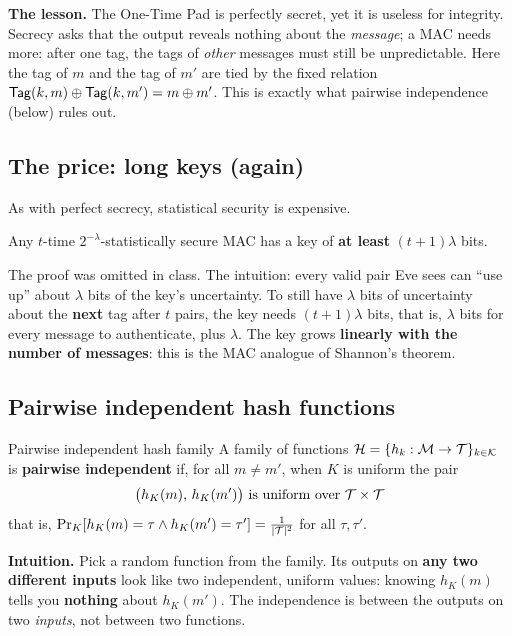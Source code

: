 \textbf{The lesson.} The One-Time Pad is perfectly secret, yet it is useless for integrity. Secrecy asks that the output reveals nothing about the \textit{message}; a MAC needs more: after one tag, the tags of \textit{other} messages must still be unpredictable. Here the tag of $m$ and the tag of $m'$ are tied by the fixed relation $\mathsf{Tag}(k, m) \oplus \mathsf{Tag}(k, m') = m \oplus m'$. This is exactly what pairwise independence (below) rules out.

\subsection{The price: long keys (again)}

As with perfect secrecy, statistical security is expensive.

\begin{framedthm}[label={thm:mac-key-size}]{}
  Any $t$-time $2^{-\lambda}$-statistically secure MAC has a key of \textbf{at least} $(t+1)\lambda$ bits.
\end{framedthm}

The proof was omitted in class. The intuition: every valid pair Eve sees can ``use up'' about $\lambda$ bits of the key's uncertainty. To still have $\lambda$ bits of uncertainty about the \textbf{next} tag after $t$ pairs, the key needs $(t+1)\lambda$ bits, that is, $\lambda$ bits for every message to authenticate, plus $\lambda$. The key grows \textbf{linearly with the number of messages}: this is the MAC analogue of Shannon's theorem.

\subsection{Pairwise independent hash functions}

\begin{frameddefn}[label={def:pairwise}]{Pairwise independent hash family}
  A family of functions $\mathcal{H} = \{h_k : \mathcal{M} \to \mathcal{T}\}_{k \in \mathcal{K}}$ is \textbf{pairwise independent} if, for all $m \neq m'$, when $K$ is uniform the pair
  \[
    \big(h_K(m),\, h_K(m')\big) \text{ is uniform over } \mathcal{T} \times \mathcal{T}
  \]
  that is, $\Pr_K[h_K(m) = \tau \wedge h_K(m') = \tau'] = \frac{1}{|\mathcal{T}|^2}$ for all $\tau, \tau'$.
\end{frameddefn}

\textbf{Intuition.} Pick a random function from the family. Its outputs on \textbf{any two different inputs} look like two independent, uniform values: knowing $h_K(m)$ tells you \textbf{nothing} about $h_K(m')$. The independence is between the outputs on two \textit{inputs}, not between two functions.

